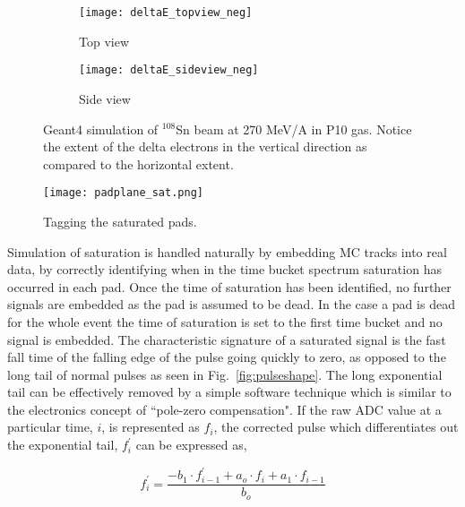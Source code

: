 \begin{figure}[!htb]
    \centering
    \begin{subfigure}[t]{0.49\textwidth}
        \centering
        \texttt{[image: deltaE\_topview\_neg]} 
        \caption{Top view} \label{fig:deltaE_topview}
    \end{subfigure}
    \hfill
    \begin{subfigure}[t]{0.49\textwidth}
        \centering
        \texttt{[image: deltaE\_sideview\_neg]} 
        \caption{Side view} \label{fig:deltaE_sideview}
    \end{subfigure}
    \caption{Geant4 simulation of ${}^{108}$Sn beam at 270 MeV/A in P10 gas. Notice the extent of the delta electrons in the vertical direction as compared to the horizontal extent. }
\label{fig:deltaE}
\end{figure}


\begin{figure}[!htb]
\texttt{[image: padplane\_sat.png]}
\caption{Tagging the saturated pads.}
\label{fig:satTag}
\end{figure}

Simulation of saturation is handled naturally by embedding MC tracks into real data, by correctly identifying when in the time bucket spectrum saturation has occurred in each pad. Once the time of saturation has been identified, no further signals are embedded as the pad is assumed to be dead. In the case a pad is dead for the whole event the time of saturation is set to the first time bucket and no signal is embedded. The characteristic signature of a saturated signal is the fast fall time of the falling edge of the pulse going quickly to zero, as opposed to the long tail of normal pulses as seen in Fig.~\ref{fig:pulseshape}. The long exponential tail can be effectively removed by a simple software technique which is similar to the electronics concept of ``pole-zero compensation". If the raw ADC value at a particular time, $i$, is represented as $f_i$, the corrected pulse which differentiates out the exponential tail, $f_i^{'}$ can be expressed as, 

\begin{equation}
f_i^{'} = \frac{-b_1\cdot f_{i-1}^{'} + a_o\cdot f_i + a_1 \cdot f_{i-1}}{b_o}
\label{eq:satpolez}
\end{equation}

